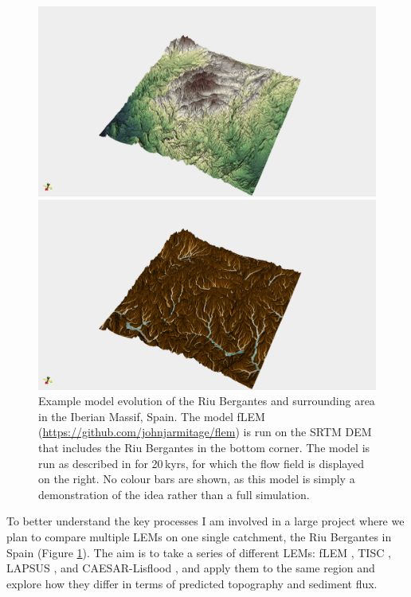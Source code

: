 \begin{figure}
\begin{minipage}{\textwidth}
\begin{minipage}{.5\textwidth}
\includegraphics[width=.98\textwidth]{./figures/ch3-bergantes-elevation.png}
\end{minipage}
\begin{minipage}{.5\textwidth}
\includegraphics[width=.98\textwidth]{./figures/ch3-bergantes-flow.png}
\end{minipage}
\end{minipage}
\caption{Example model evolution of the Riu Bergantes and surrounding area in the Iberian Massif, Spain. The model fLEM (\url{https://github.com/johnjarmitage/flem}) is run on the SRTM DEM that includes the Riu Bergantes in the bottom corner. The model is run as described in \cite{armitage-2019} for 20\,kyrs, for which the flow field is displayed on the right. No colour bars are shown, as this model is simply a demonstration of the idea rather than a full simulation.}
\label{fg:bergantes}
\end{figure}

To better understand the key processes I am involved in a large project where we plan to compare multiple LEMs on one single catchment, the Riu Bergantes in Spain (Figure \ref{fg:bergantes}). The aim is to take a series of different LEMs: fLEM \citep{armitage-2019}, TISC \citep{garcia-castellanos-2002}, LAPSUS \citep{schoorl-etal-2000}, and CAESAR-Lisflood \citep{coulthard-etal-2013}, and apply them to the same region and explore how they differ in terms of predicted topography and sediment flux.

